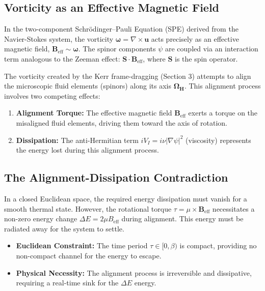 \documentclass[11pt]{article}
\begin{document}
\subsection{Vorticity as an Effective Magnetic Field}

In the two-component Schr\"odinger--Pauli Equation (SPE) derived from the Navier-Stokes system, the vorticity $\mathbf{\omega} = \nabla \times \mathbf{u}$ acts precisely as an effective magnetic field, $\mathbf{B}_{\text{eff}} \sim \mathbf{\omega}$. The spinor components $\psi$ are coupled via an interaction term analogous to the Zeeman effect: $\mathbf{S} \cdot \mathbf{B}_{\text{eff}}$, where $\mathbf{S}$ is the spin operator.

The vorticity created by the Kerr frame-dragging (Section 3) attempts to align the microscopic fluid elements (spinors) along its axis $\mathbf{\Omega_H}$. This alignment process involves two competing effects:

\begin{enumerate}
    \item \textbf{Alignment Torque:} The effective magnetic field $\mathbf{B}_{\text{eff}}$ exerts a torque on the misaligned fluid elements, driving them toward the axis of rotation.
    \item \textbf{Dissipation:} The anti-Hermitian term $iV_I = i\nu|\nabla\psi|^2$ (viscosity) represents the energy lost during this alignment process.
\end{enumerate}

\subsection{The Alignment-Dissipation Contradiction}

In a closed Euclidean space, the required energy dissipation must vanish for a smooth thermal state. However, the rotational torque $\tau = \mu \times \mathbf{B}_{\text{eff}}$ necessitates a non-zero energy change $\Delta E = 2\mu B_{\text{eff}}$ during alignment. This energy must be radiated away for the system to settle.

\begin{itemize}
    \item \textbf{Euclidean Constraint:} The time period $\tau \in [0,\beta)$ is compact, providing no non-compact channel for the energy to escape.
    \item \textbf{Physical Necessity:} The alignment process is irreversible and dissipative, requiring a real-time sink for the $\Delta E$ energy.
\end{itemize}
\end{document}
